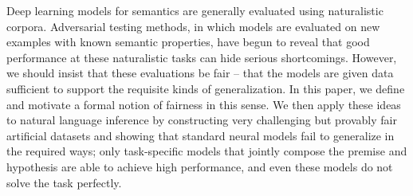 Deep learning models for semantics are generally evaluated using naturalistic corpora. Adversarial testing methods, in which models are evaluated on new examples with known semantic properties, have begun to reveal that good performance at these naturalistic tasks can hide serious shortcomings. However, we should insist that these evaluations be fair -- that the models are given data sufficient to support the requisite kinds of generalization. In this paper, we define and motivate a formal notion of fairness in this sense. We then apply these ideas to natural language inference by constructing very challenging but provably fair artificial datasets and showing that standard neural models fail to generalize in the required ways; only task-specific models that jointly compose the premise and hypothesis are able to achieve high performance, and even these models do not solve the task perfectly.